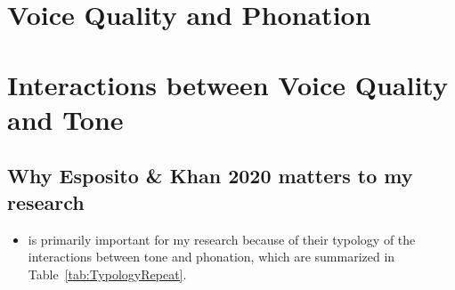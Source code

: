 \section{Voice Quality and Phonation} \label{sec:voice_quality_and_phonation}


\section{Interactions between Voice Quality and Tone} \label{sec:interactions_between_voice_quality_and_tone}

\subsection{Why Esposito \& Khan 2020 matters to my research} \label{sec:WhyEspositoKhanMatters}

\begin{itemize}
    \item \citet{espositoCrosslinguisticPatternsPhonation2020} is primarily important for my research because of their typology of the interactions between tone and phonation, which are summarized in Table~\ref{tab:TypologyRepeat}.
\end{itemize}

